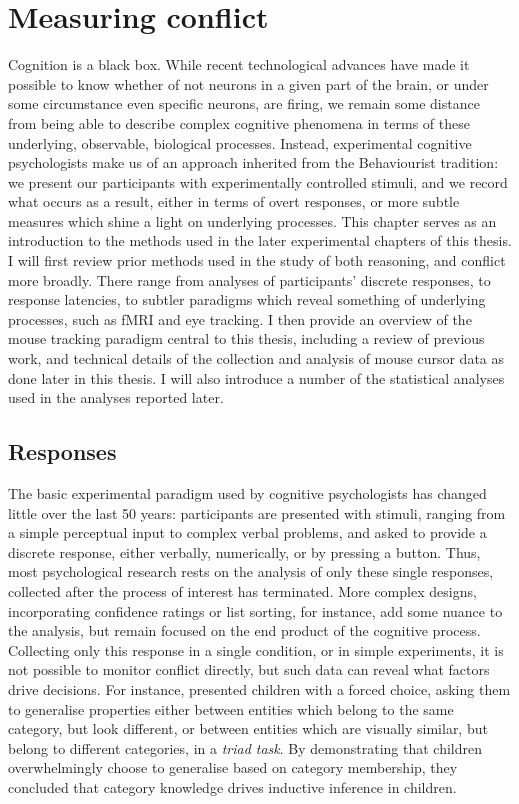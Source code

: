 
\section{Measuring conflict}\label{measuring-conflict}

Cognition is a black box.
While recent technological advances have made it possible
to know whether of not neurons in a given part of the brain,
or under some circumstance even specific neurons, are firing,
we remain some distance from being able to
describe complex cognitive phenomena
in terms of these underlying, observable, biological processes.
Instead, experimental cognitive psychologists make us of an approach
inherited from the Behaviourist tradition:
we present our participants
with experimentally controlled stimuli,
and we record what occurs as a result,
either in terms of overt responses,
or more subtle measures which shine a light on underlying processes.
This chapter serves as an introduction to the methods
used in the later experimental chapters of this thesis.
I will first review prior methods used in the study 
of both reasoning, and conflict more broadly.
There range from analyses of participants' discrete responses,
to response latencies, to subtler paradigms which reveal
something of underlying processes, such as fMRI and eye tracking.
I then provide an overview of the mouse tracking paradigm
central to this thesis, including a review of previous work,
and technical details of the collection and analysis of
mouse cursor data as done later in this thesis.
I will also introduce a number of the statistical analyses
used in the analyses reported later.


\subsection{Responses}\label{responses}

The basic experimental paradigm used by cognitive psychologists
has changed little over the last 50 years:
participants are presented with stimuli,
ranging from a simple perceptual input
to complex verbal problems,
and asked to provide a discrete response,
either verbally, numerically, or by pressing a button.
Thus, most %
psychological research rests on
the analysis of only these single responses,
collected after the process of interest has terminated.
More complex designs,
incorporating confidence ratings or list sorting,
for instance, add some nuance to the analysis,
but remain focused on the end product of the cognitive process.
Collecting only this response in a single condition,
or in simple experiments,
it is not possible to monitor conflict directly,
but such data can reveal what factors drive decisions.
For instance, \citet[discussed in chap. 1]{Gelman1986} 
presented children with a forced choice,
asking them to generalise properties either
between entities which belong to the same category,
but look different,
or between entities which are visually similar,
but belong to different categories,
in a \emph{triad task}.
By demonstrating that children overwhelmingly choose
to generalise based on category membership,
they concluded that category knowledge
drives inductive inference in children.

